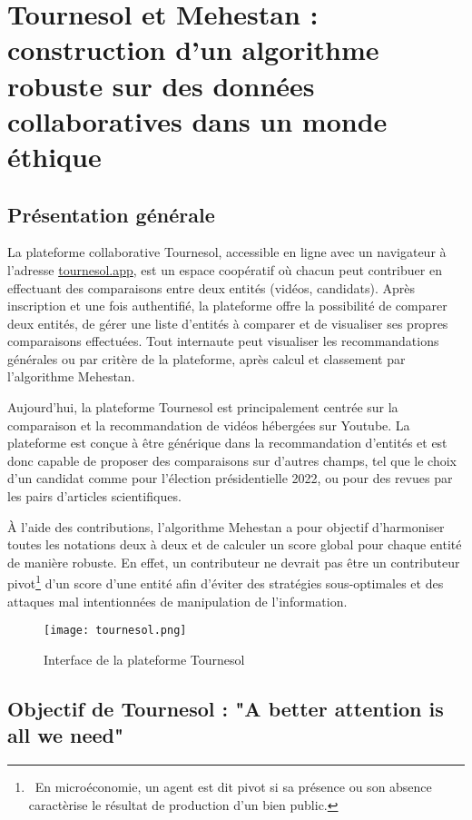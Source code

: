 \section{Tournesol et Mehestan : construction d'un algorithme robuste sur des données collaboratives dans un monde éthique}

\subsection{Présentation générale}

La plateforme collaborative Tournesol, accessible en ligne avec un navigateur à l'adresse
\href{https://tournesol.app}{tournesol.app}, est un espace coopératif où chacun peut contribuer en effectuant des comparaisons entre deux entités (vidéos, candidats). Après inscription et une fois authentifié, la plateforme offre la possibilité de comparer deux entités, de gérer une liste d'entités à comparer et de visualiser ses propres comparaisons effectuées. Tout internaute peut visualiser les recommandations générales ou par critère de la plateforme, après calcul et classement par l'algorithme Mehestan.

Aujourd'hui, la plateforme Tournesol est principalement centrée sur la comparaison et la recommandation de vidéos hébergées sur Youtube. La plateforme est conçue à être générique dans la recommandation d'entités et est donc capable de proposer des comparaisons sur d'autres champs, tel que le choix d'un candidat comme pour l'élection présidentielle 2022, ou pour des revues par les pairs d'articles scientifiques.


À l'aide des contributions, l'algorithme Mehestan a pour objectif d'harmoniser toutes les notations deux à deux et de calculer un score global pour chaque entité de manière robuste. En effet, un contributeur ne devrait pas être un contributeur pivot\footnote{~En microéconomie, un agent est dit pivot si sa présence ou son absence caractèrise le résultat de production d'un bien public.} d'un score d'une entité afin d'éviter des stratégies sous-optimales et des attaques mal intentionnées de manipulation de l'information.

\begin{figure}[ht]
  \texttt{[image: tournesol.png]}
  \caption{Interface de la plateforme Tournesol}
\end{figure}


\subsection{Objectif de Tournesol : "A better attention is all we need"}



